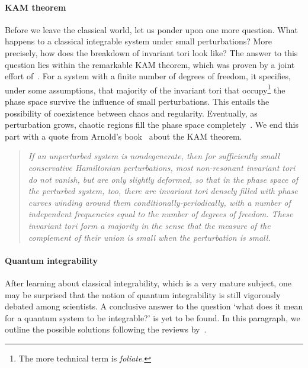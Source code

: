 \paragraph{KAM theorem}Before we leave the classical world, let us ponder upon one more question.
What happens to a classical integrable system under small perturbations? More precisely,
how does the breakdown of invariant tori look like? The answer to this question lies
within the remarkable KAM theorem, which was proven by a joint effort
of~\textcite{Kolmogorov1954,Moser1962,Arnold1963}. For
a system with a finite number of degrees of freedom, it specifies, under some assumptions,
that majority of the invariant tori that occupy\footnote{The more technical term is
\textit{foliate}.} the phase space survive the influence of small perturbations. This entails
the possibility of coexistence between chaos and regularity. Eventually, as perturbation grows,
chaotic regions fill the phase space completely~\autocite{DAlessio2016}. We end this part
with a quote from Arnold's book~\autocite{arnold2013mathematical} about the KAM theorem.
\begin{quotation}
   \textit{ If an unperturbed system is nondegenerate, then for sufficiently
small conservative Hamiltonian perturbations, most non-resonant invariant
tori do not vanish, but are only slightly deformed, so that in the phase space
of the perturbed system, too, there are invariant tori densely filled with phase
curves winding around them conditionally-periodically, with a number of
independent frequencies equal to the number of degrees of freedom.
These invariant tori form a majority in the sense that the measure of the
complement of their union is small when the perturbation is small.}
\end{quotation}
\paragraph{Quantum integrability} After learning about classical integrability, which
is a very mature subject, one may be surprised that the notion of quantum integrability 
is still vigorously debated among scientists. A conclusive answer to the question
`what does it mean for a quantum system to be integrable?' is yet to be found.
In this paragraph, we outline the possible solutions following the reviews
by~\textcite{Caux2011,Yuzbashyan2013}.

